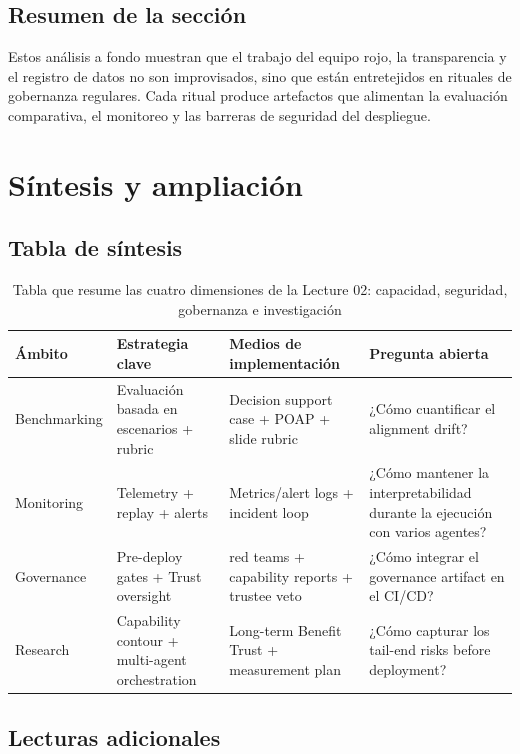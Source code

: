 \documentclass[a4paper]{article}
\begin{document}
\subsection{Resumen de la sección}

Estos análisis a fondo muestran que el trabajo del equipo rojo, la transparencia y el registro de datos no son improvisados, sino que están entretejidos en rituales de gobernanza regulares. Cada ritual produce artefactos que alimentan la evaluación comparativa, el monitoreo y las barreras de seguridad del despliegue.
\section{Síntesis y ampliación}

\subsection{Tabla de síntesis}

\begin{table}[H]
\centering
\begin{tabular}{p{} p{} p{} p{}}
\toprule
Ámbito & Estrategia clave & Medios de implementación & Pregunta abierta \\
\midrule
Benchmarking & Evaluación basada en escenarios + rubric & Decision support case + POAP + slide rubric & ¿Cómo cuantificar el alignment drift? \\
Monitoring & Telemetry + replay + alerts & Metrics/alert logs + incident loop & ¿Cómo mantener la interpretabilidad durante la ejecución con varios agentes? \\
Governance & Pre-deploy gates + Trust oversight & red teams + capability reports + trustee veto & ¿Cómo integrar el governance artifact en el CI/CD? \\
Research & Capability contour + multi-agent orchestration & Long-term Benefit Trust + measurement plan & ¿Cómo capturar los tail-end risks before deployment? \\
\bottomrule
\end{tabular}
\caption{Tabla que resume las cuatro dimensiones de la Lecture 02: capacidad, seguridad, gobernanza e investigación}
\end{table}

\subsection{Lecturas adicionales}
\end{document}
